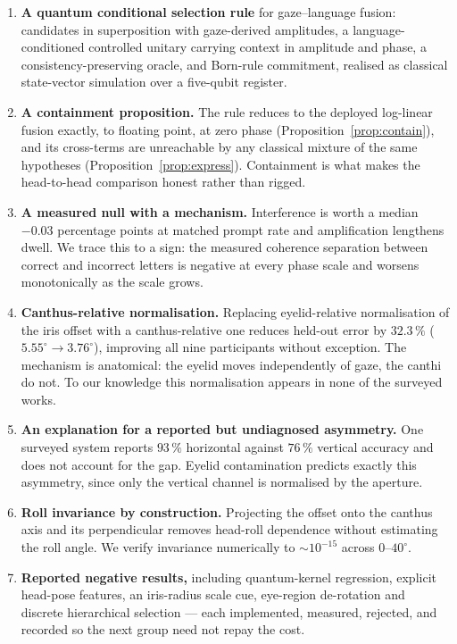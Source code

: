 \documentclass[conference]{IEEEtran}
\begin{document}
\begin{enumerate}
  \item \textbf{A quantum conditional selection rule} for gaze--language fusion:
  candidates in superposition with gaze-derived amplitudes, a
  language-conditioned controlled unitary carrying context in amplitude and
  phase, a consistency-preserving oracle, and Born-rule commitment, realised as
  classical state-vector simulation over a five-qubit register.

  \item \textbf{A containment proposition.} The rule reduces to the deployed
  log-linear fusion exactly, to floating point, at zero phase
  (Proposition~\ref{prop:contain}), and its cross-terms are unreachable by any
  classical mixture of the same hypotheses (Proposition~\ref{prop:express}).
  Containment is what makes the head-to-head comparison honest rather than
  rigged.

  \item \textbf{A measured null with a mechanism.} Interference is worth a
  median $-0.03$ percentage points at matched prompt rate and amplification
  lengthens dwell. We trace this to a sign: the measured coherence separation
  between correct and incorrect letters is negative at every phase scale and
  worsens monotonically as the scale grows.

  \item \textbf{Canthus-relative normalisation.} Replacing eyelid-relative
  normalisation of the iris offset with a canthus-relative one reduces held-out
  error by $32.3\,\%$ ($5.55^\circ \rightarrow 3.76^\circ$), improving all nine
  participants without exception. The mechanism is anatomical: the eyelid moves independently
  of gaze, the canthi do not. To our knowledge this normalisation appears in
  none of the surveyed works.

  \item \textbf{An explanation for a reported but undiagnosed asymmetry.} One
  surveyed system reports $93\,\%$ horizontal against $76\,\%$ vertical accuracy
  and does not account for the gap. Eyelid contamination predicts exactly this
  asymmetry, since only the vertical channel is normalised by the aperture.

  \item \textbf{Roll invariance by construction.} Projecting the offset onto the
  canthus axis and its perpendicular removes head-roll dependence without
  estimating the roll angle. We verify invariance numerically to
  $\sim$$10^{-15}$ across $0$--$40^\circ$.


  \item \textbf{Reported negative results,} including quantum-kernel regression,
  explicit head-pose features, an iris-radius scale cue, eye-region de-rotation
  and discrete hierarchical selection --- each implemented, measured, rejected,
  and recorded so the next group need not repay the cost.
\end{enumerate}
\end{document}
